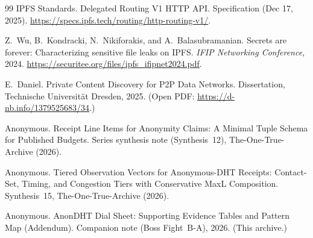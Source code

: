 \documentclass[11pt]{article}
\begin{document}
\begin{thebibliography}{99}
IPFS Standards.
\newblock Delegated Routing V1 HTTP API.
\newblock Specification (Dec 17, 2025).
\newblock \url{https://specs.ipfs.tech/routing/http-routing-v1/}.

Z.~Wu, B.~Kondracki, N.~Nikiforakis, and A.~Balasubramanian.
\newblock Secrets are forever: Characterizing sensitive file leaks on IPFS.
\newblock \emph{IFIP Networking Conference}, 2024.
\newblock \url{https://securitee.org/files/ipfs_ifipnet2024.pdf}.

E.~Daniel.
\newblock Private Content Discovery for P2P Data Networks.
\newblock Dissertation, Technische Universit\"at Dresden, 2025.
\newblock (Open PDF: \url{https://d-nb.info/1379525683/34}.)

Anonymous.
\newblock Receipt Line Items for Anonymity Claims: A Minimal Tuple Schema for Published Budgets.
\newblock Series synthesis note (Synthesis~12), The-One-True-Archive (2026).


Anonymous.
\newblock Tiered Observation Vectors for Anonymous-DHT Receipts: Contact-Set, Timing, and Congestion Tiers with Conservative MaxL Composition.
\newblock Synthesis~15, The-One-True-Archive (2026).

Anonymous.
\newblock AnonDHT Dial Sheet: Supporting Evidence Tables and Pattern Map (Addendum).
\newblock Companion note (Boss Fight~B-A), 2026. (This archive.)

\end{thebibliography}
\end{document}
